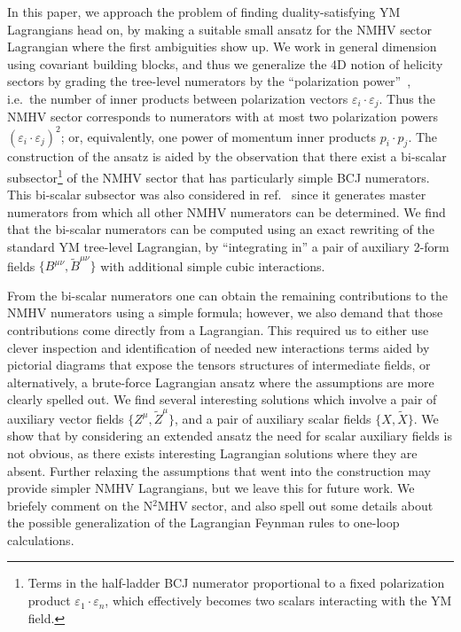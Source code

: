 \documentclass[11pt,a4paper]{article}
\begin{document}
In this paper, we approach the problem of finding duality-satisfying YM Lagrangians head on, by making a suitable small ansatz for the  NMHV sector Lagrangian where the first ambiguities show up. We work in general dimension using covariant building blocks, and thus we generalize the 4D notion of helicity sectors by grading the tree-level numerators by the ``polarization power''~\cite{Chen:2019ywi,Chen:2021chy}, i.e.~the number of inner products between polarization vectors $\varepsilon_i {\cdot} \varepsilon_j$. Thus the NMHV sector corresponds to numerators with at most two polarization powers $(\varepsilon_i {\cdot} \varepsilon_j)^2$; or, equivalently, one power of momentum inner products $p_i {\cdot} p_j$. The construction of the ansatz is aided by the observation that there exist a bi-scalar subsector\footnote{Terms in the half-ladder BCJ numerator proportional to a fixed polarization product $\varepsilon_1 {\cdot} \varepsilon_n$, which effectively becomes two scalars interacting with the YM field.} of the NMHV sector that has particularly simple BCJ numerators. This bi-scalar subsector was also considered in ref.~\cite{Chen:2019ywi} since it generates master numerators from which all other NMHV numerators can be determined. We find that the bi-scalar numerators can be computed using an exact rewriting of the standard YM tree-level Lagrangian, by ``integrating in'' a pair of auxiliary 2-form fields $\{B^{\mu\nu},\tilde B^{\mu\nu}\}$ with additional simple cubic interactions.    

From the bi-scalar numerators one can obtain the remaining contributions to the NMHV numerators using a simple formula; however, we also demand that those contributions come directly from a Lagrangian. This required us to either use clever inspection and identification of needed new interactions terms aided by pictorial diagrams that expose the tensors structures of intermediate fields, or alternatively, a brute-force Lagrangian ansatz where the assumptions are more clearly spelled out. We find several interesting solutions which involve a pair of auxiliary vector fields $\{Z^{\mu},\tilde Z^{\mu}\}$, and a pair of auxiliary scalar fields $\{X,\tilde X\}$. We show that by considering an extended ansatz the need for scalar auxiliary fields is not obvious, as there exists interesting Lagrangian solutions where they are absent. Further relaxing the assumptions that went into the construction may provide simpler NMHV Lagrangians, but we leave this for future work. We briefely comment on the N${}^2$MHV sector, and also spell out some details about the possible generalization of the Lagrangian Feynman rules to one-loop calculations. 
\end{document}
